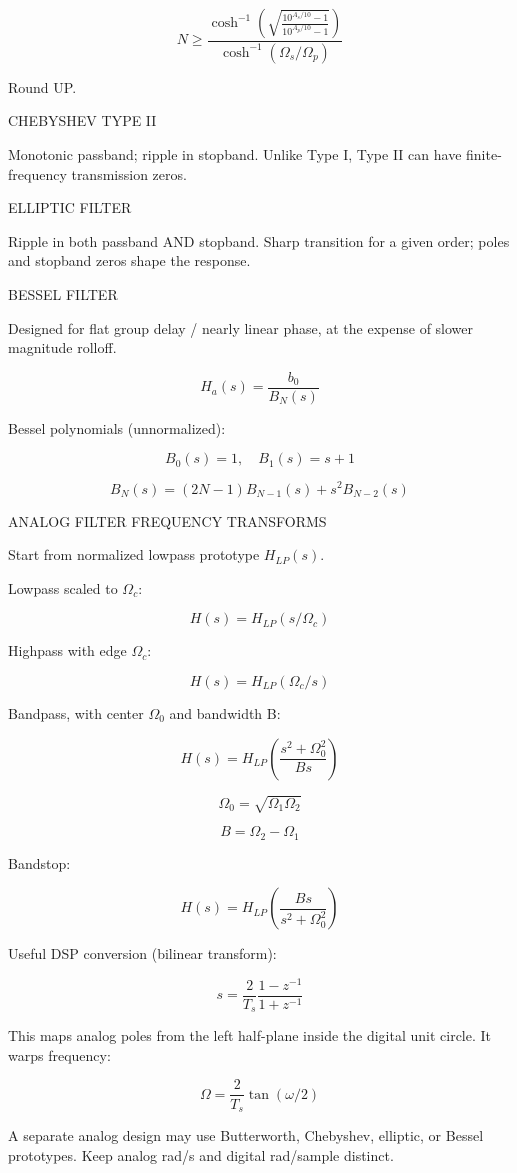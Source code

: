 $$N\ge\frac{\cosh^{-1}\left(\sqrt{\frac{10^{A_s/10}-1}{10^{A_p/10}-1}}\right)}{\cosh^{-1}(\Omega_s/\Omega_p)}$$

Round UP.

CHEBYSHEV TYPE II

Monotonic passband; ripple in stopband. Unlike Type I, Type II can have finite-frequency transmission zeros.

ELLIPTIC FILTER

Ripple in both passband AND stopband. Sharp transition for a given order; poles and stopband zeros shape the response.

BESSEL FILTER

Designed for flat group delay / nearly linear phase, at the expense of slower magnitude rolloff.

$$H_a(s)=\frac{b_0}{B_N(s)}$$

Bessel polynomials (unnormalized):

$$B_0(s)=1,\quad B_1(s)=s+1$$

$$B_N(s)=(2N-1)B_{N-1}(s)+s^2B_{N-2}(s)$$

ANALOG FILTER FREQUENCY TRANSFORMS

Start from normalized lowpass prototype $H_{LP}(s)$.

Lowpass scaled to $\Omega_c$:

$$H(s)=H_{LP}(s/\Omega_c)$$

Highpass with edge $\Omega_c$:

$$H(s)=H_{LP}(\Omega_c/s)$$

Bandpass, with center $\Omega_0$ and bandwidth B:

$$H(s)=H_{LP}\left(\frac{s^2+\Omega_0^2}{Bs}\right)$$

$$\Omega_0=\sqrt{\Omega_1\Omega_2}$$

$$B=\Omega_2-\Omega_1$$

Bandstop:

$$H(s)=H_{LP}\left(\frac{Bs}{s^2+\Omega_0^2}\right)$$

Useful DSP conversion (bilinear transform):

$$s=\frac{2}{T_s}\frac{1-z^{-1}}{1+z^{-1}}$$

This maps analog poles from the left half-plane inside the digital unit circle. It warps frequency:

$$\Omega=\frac{2}{T_s}\tan(\omega/2)$$

A separate analog design may use Butterworth, Chebyshev, elliptic, or Bessel prototypes. Keep analog rad/s and digital rad/sample distinct.
